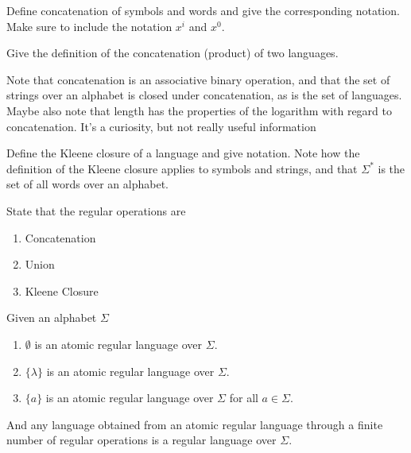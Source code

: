 \documentclass{bcthesis}
\renewcommand{\meo}{}
\begin{document}
	\begin{definition}[Concatenation]
		Define concatenation of symbols and words and give the corresponding notation.
		\meo{
			Make sure to include the notation $x^i$ and $x^0$.
		}
	\end{definition}

	\begin{definition}
		Give the definition of the concatenation (product) of two languages.
	\end{definition}

	\begin{remark}
		Note that concatenation is an associative binary operation, and that the set of strings over an alphabet is closed under concatenation, as is the set of languages.
		\meo{
			Maybe also note that length has the properties of the logarithm with regard to concatenation.
			It's a curiosity, but not really useful information
		}
	\end{remark}

	\iffalse
	\begin{definition}[Positive Closure]
		Define the positive closure of a set and give notation. 
		Also give notation and meaning for the set of nonempty words over an alphabet.
		\note{I'm not sure I actually need to include this.}
	\end{definition}
	\fi

	\begin{definition}
		Define the Kleene closure of a language and give notation.
		Note how the definition of the Kleene closure applies to symbols and strings, and that $\Sigma^*$ is the set of all words over an alphabet.
	\end{definition}

	\begin{definition}
		State that the regular operations are 
		\begin{enumerate}[label=(\roman*), itemsep = -0.3 ex]
			\item Concatenation
			\item Union
			\item Kleene Closure
		\end{enumerate}
	\end{definition}

	\begin{definition}
		Given an alphabet $\Sigma$
		\begin{enumerate}[label=(\roman*), itemsep = -0.3 ex]
			\item $\emptyset$ is an atomic regular language over $\Sigma$.
			\item $\{ \lambda \}$ is an atomic regular language over $\Sigma$.
			\item $\{ a \}$ is an atomic regular language over $\Sigma$ for all $a \in \Sigma$.
		\end{enumerate}
		And any language obtained from an atomic regular language through a finite number of regular operations is a regular language over $\Sigma$.
	\end{definition}
\end{document}
